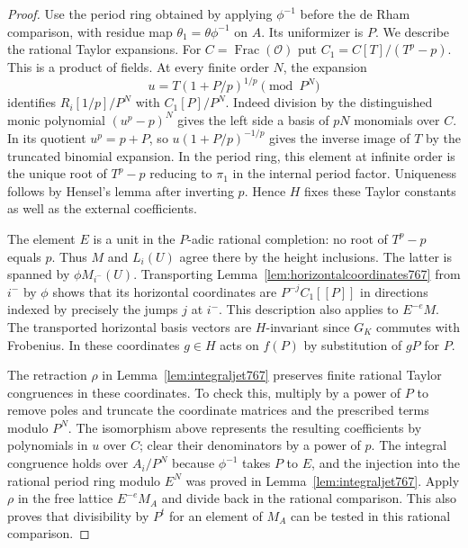 \documentclass[a4paper,11pt]{article}
\theoremstyle{definition}
\theoremstyle{remark}
\numberwithin{equation}{section}
\begin{document}
\begin{proof}
Use the period ring obtained by applying \(\phi^{-1}\)
before the de Rham comparison, with residue map
\(\theta_1=\theta\phi^{-1}\) on \(A\). Its uniformizer
is \(P\). We describe the rational Taylor expansions.
For \(C=\operatorname{Frac}(\mathcal O)\) put
\(C_1=C[T]/(T^p-p)\). This is a product of fields.
At every finite order \(N\), the expansion
\[
             u=T(1+P/p)^{1/p}\pmod {P^N}
\]
identifies \(R_i[1/p]/P^N\) with \(C_1[P]/P^N\).
Indeed division by the distinguished monic polynomial
\((u^p-p)^N\) gives the left side a basis of \(pN\)
monomials over \(C\). In its quotient \(u^p=p+P\),
so \(u(1+P/p)^{-1/p}\) gives the inverse image of \(T\)
by the truncated binomial expansion. In the period ring,
this element at infinite order is the unique root of
\(T^p-p\) reducing to \(\pi_1\) in the internal period
factor. Uniqueness follows by Hensel's lemma after inverting
\(p\). Hence \(H\) fixes these Taylor constants as well
as the external coefficients.

The element \(E\) is a unit in the \(P\)-adic rational
completion: no root of \(T^p-p\) equals \(p\).
Thus \(M\) and \(L_i(U)\) agree there by the height
inclusions. The latter is spanned by \(\phi M_{i^-}(U)\).
Transporting Lemma~\ref{lem:horizontalcoordinates767}
from \(i^-\) by \(\phi\) shows that its horizontal
coordinates are \(P^{-j}C_1[[P]]\) in directions indexed
by precisely the jumps \(j\) at \(i^-\).
This description also applies to \(E^{-e}M\). The transported
horizontal basis vectors are \(H\)-invariant since \(G_K\)
commutes with Frobenius. In these coordinates \(g\in H\)
acts on \(f(P)\) by substitution of \(gP\) for \(P\).

The retraction \(\rho\) in Lemma~\ref{lem:integraljet767}
preserves finite rational Taylor congruences in these
coordinates. To check this, multiply by a power of \(P\)
to remove poles and truncate the coordinate matrices and
the prescribed terms modulo \(P^N\). The isomorphism above
represents the resulting coefficients by polynomials in
\(u\) over \(C\); clear their denominators by a power of
\(p\). The integral congruence holds over \(A_i/P^N\)
because \(\phi^{-1}\) takes \(P\) to \(E\), and the
injection into the rational period ring modulo \(E^N\)
was proved in Lemma~\ref{lem:integraljet767}. Apply
\(\rho\) in the free lattice \(E^{-e}M_A\) and divide back
in the rational comparison. This also proves that
divisibility by \(P^t\) for an element of \(M_A\) can
be tested in this rational comparison.


\end{proof}
\end{document}
